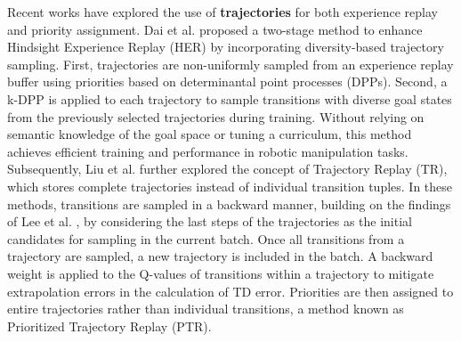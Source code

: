 
Recent works have explored the use of \textbf{trajectories} for both experience replay and priority assignment. Dai et al. \cite{dai2021diversity} proposed a two-stage method to enhance Hindsight Experience Replay (HER) by incorporating diversity-based trajectory sampling. First, trajectories are non-uniformly sampled from an experience replay buffer using priorities based on determinantal point processes (DPPs). Second, a k-DPP is applied to each trajectory to sample transitions with diverse goal states from the previously selected trajectories during training. Without relying on semantic knowledge of the goal space or tuning a curriculum, this method achieves efficient training and performance in robotic manipulation tasks. Subsequently, Liu et al. \cite{liu2023prioritized} further explored the concept of Trajectory Replay (TR), which stores complete trajectories instead of individual transition tuples. In these methods, transitions are sampled in a backward manner, building on the findings of Lee et al. \cite{lee2019sample}, by considering the last steps of the trajectories as the initial candidates for sampling in the current batch. Once all transitions from a trajectory are sampled, a new trajectory is included in the batch. A backward weight is applied to the Q-values of transitions within a trajectory to mitigate extrapolation errors in the calculation of TD error. Priorities are then assigned to entire trajectories rather than individual transitions, a method known as Prioritized Trajectory Replay (PTR). 





